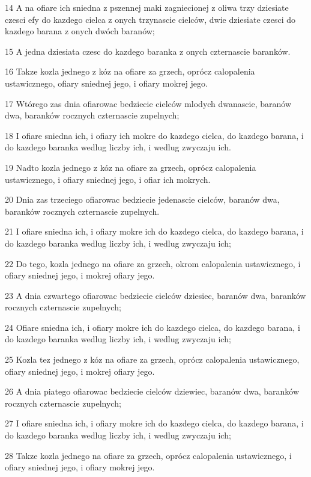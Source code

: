 \par 14 A na ofiare ich sniedna z pszennej maki zagniecionej z oliwa trzy dziesiate czesci efy do kazdego cielca z onych trzynascie cielców, dwie dziesiate czesci do kazdego barana z onych dwóch baranów;
\par 15 A jedna dziesiata czesc do kazdego baranka z onych czternascie baranków.
\par 16 Takze kozla jednego z kóz na ofiare za grzech, oprócz calopalenia ustawicznego, ofiary sniednej jego, i ofiary mokrej jego.
\par 17 Wtórego zas dnia ofiarowac bedziecie cielców mlodych dwanascie, baranów dwa, baranków rocznych czternascie zupelnych;
\par 18 I ofiare sniedna ich, i ofiary ich mokre do kazdego cielca, do kazdego barana, i do kazdego baranka wedlug liczby ich, i wedlug zwyczaju ich.
\par 19 Nadto kozla jednego z kóz na ofiare za grzech, oprócz calopalenia ustawicznego, i ofiary sniednej jego, i ofiar ich mokrych.
\par 20 Dnia zas trzeciego ofiarowac bedziecie jedenascie cielców, baranów dwa, baranków rocznych czternascie zupelnych.
\par 21 I ofiare sniedna ich, i ofiary mokre ich do kazdego cielca, do kazdego barana, i do kazdego baranka wedlug liczby ich, i wedlug zwyczaju ich;
\par 22 Do tego, kozla jednego na ofiare za grzech, okrom calopalenia ustawicznego, i ofiary sniednej jego, i mokrej ofiary jego.
\par 23 A dnia czwartego ofiarowac bedziecie cielców dziesiec, baranów dwa, baranków rocznych czternascie zupelnych;
\par 24 Ofiare sniedna ich, i ofiary mokre ich do kazdego cielca, do kazdego barana, i do kazdego baranka wedlug liczby ich, i wedlug zwyczaju ich;
\par 25 Kozla tez jednego z kóz na ofiare za grzech, oprócz calopalenia ustawicznego, ofiary sniednej jego, i mokrej ofiary jego.
\par 26 A dnia piatego ofiarowac bedziecie cielców dziewiec, baranów dwa, baranków rocznych czternascie zupelnych;
\par 27 I ofiare sniedna ich, i ofiary mokre ich do kazdego cielca, do kazdego barana, i do kazdego baranka wedlug liczby ich, i wedlug zwyczaju ich;
\par 28 Takze kozla jednego na ofiare za grzech, oprócz calopalenia ustawicznego, i ofiary sniednej jego, i ofiary mokrej jego.

